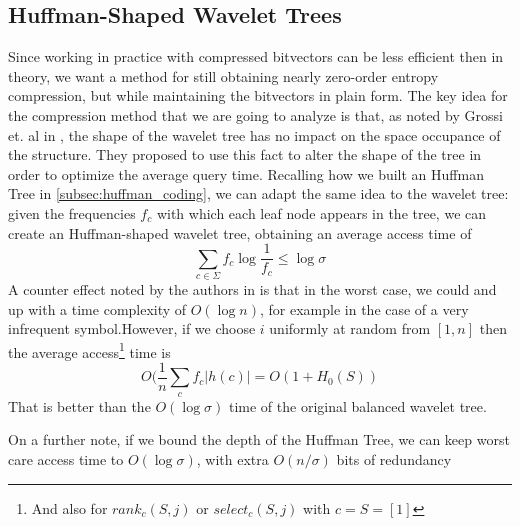 \subsection{Huffman-Shaped Wavelet Trees}
Since working in practice with compressed bitvectors can be less efficient then in theory, we want a method for still obtaining nearly zero-order entropy compression, but while maintaining the bitvectors in plain form. The key idea for the compression method that we are going to analyze is that, as noted by Grossi et. al in \cite{grossi2004indexing}, the shape of the wavelet tree has no impact on the space occupance of the structure. They proposed to use this fact to alter the shape of the tree in order to optimize the average query time. Recalling how we built an Huffman Tree in \ref{subsec:huffman_coding}, we can adapt the same idea to the wavelet tree: given the frequencies $f_c$ with which each leaf node appears in the tree, we can create an Huffman-shaped wavelet tree, obtaining an average access time of
\begin{equation}
    \sum_{c \in \Sigma} f_c \log \frac{1}{f_c} \leq \log \sigma
\end{equation}
A counter effect noted by the authors in \cite{grossi2004indexing} is that in the worst case, we could and up with a time complexity of $O(\log n)$, for example in the case of a very infrequent symbol.However, if we choose $i$ uniformly at random from $[1, n]$ then the average access\footnote{And also for $rank_c(S,j)$ or $select_c(S,j)$ with $c = S=[1]$} time is
\begin{equation}
    O(\frac{1}{n} \sum_c f_c |h(c)| = O(1 + H_0(S))
\end{equation}
That is better than the $O(\log \sigma)$ time of the original balanced wavelet tree.

\begin{remark}
    On a further note, if we bound the depth of the Huffman Tree, we can keep worst care access time to $O(\log \sigma)$, with extra $O(n/\sigma)$ bits of redundancy
\end{remark}

